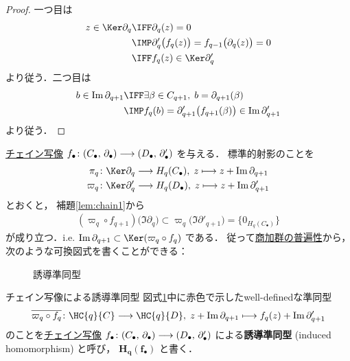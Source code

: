 \documentclass[algtopo_main]{subfiles}
\begin{document}
\begin{proof}
    一つ目は
    \begin{align}
        z \in \Ker \partial_q &\IFF \partial_q(z) = 0 \\
        &\IMP \partial'_q \bigl( f_q(z) \bigr) = f_{q-1} \bigl( \partial_q(z) \bigr) = 0 \\
        &\IFF f_q(z) \in \Ker \partial'_q
    \end{align}
    より従う．二つ目は
    \begin{align}
        b \in \Im \partial_{q+1} &\IFF \exists \beta \in C_{q+1},\; b = \partial_{q+1}(\beta)\\
        &\IMP f_q(b) = \partial'_{q+1} \bigl( f_{q+1}(\beta) \bigr)  \in \Im \partial'_{q+1}
    \end{align}
    より従う．
\end{proof}


\hyperref[def:chainmap]{チェイン写像} $f_\bullet \colon (C_\bullet,\, \partial_\bullet) \longrightarrow (D_\bullet,\, \partial'_\bullet)$ を与える．
標準的射影のことを
\begin{align}
    \pi_q &\colon \Ker \partial_q \lto H_q(C_\bullet),\; z \lmto z + \Im \partial_{q+1} \\
    \varpi_q &\colon \Ker \partial'_q \lto H_q(D_\bullet),\; z \lmto z + \Im \partial'_{q+1}
\end{align}
とおくと，
補題\ref{lem:chain1}から
\begin{align}
    (\varpi_q \circ f_{q+1})\bigl( \Im \partial_q \bigr) \subset \varpi_q \bigl( \Im \partial'_{q+1} \bigr) = \{0_{H_q(C_\bullet)} \}
\end{align}
が成り立つ．i.e. $\Im \partial_{q+1} \subset \Ker (\varpi_q\circ f_q)$ である．
従って\hyperref[lem:quomod-univ]{商加群の普遍性}から，
次のような可換図式を書くことができる：
\begin{figure}[H]
    \centering
    \caption{誘導準同型}
    \label{fig:induced}
\end{figure}%

\begin{mydef}[label=def:induced-chain]{チェイン写像による誘導準同型}
    図式\ref{fig:induced}中に赤色で示したwell-definedな準同型
    \begin{align}
        \overline{\varpi_q \circ f_q} \colon \HC{q}{C} \lto \HC{q}{D},\; z + \Im \partial_{q+1} \lmto f_q(z) + \Im \partial'_{q+1}
    \end{align}
    のことを\hyperref[def:chainmap]{チェイン写像} $f_\bullet \colon (C_\bullet,\, \partial_\bullet) \longrightarrow (D_\bullet,\, \partial'_\bullet)$ による\textbf{誘導準同型} (induced homomorphism) と呼び，
    $\bm{H_q (f_\bullet)}$ と書く．
\end{mydef}
\end{document}
